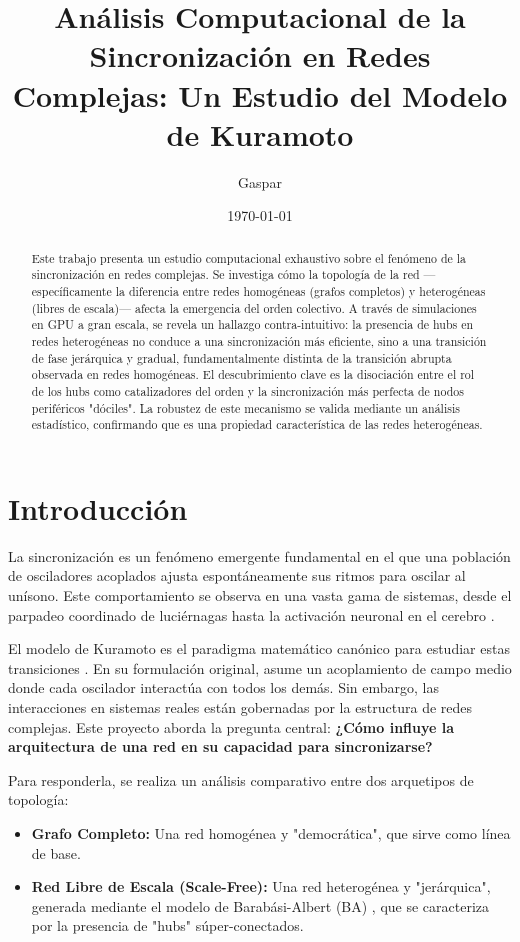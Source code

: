 \documentclass[12pt, a4paper]{article}
\title{Análisis Computacional de la Sincronización en Redes Complejas: Un Estudio del Modelo de Kuramoto}
\author{Gaspar}
\date{\today}
\begin{document}
\maketitle

\begin{abstract}
\noindent Este trabajo presenta un estudio computacional exhaustivo sobre el fenómeno de la sincronización en redes complejas. Se investiga cómo la topología de la red —específicamente la diferencia entre redes homogéneas (grafos completos) y heterogéneas (libres de escala)— afecta la emergencia del orden colectivo. A través de simulaciones en GPU a gran escala, se revela un hallazgo contra-intuitivo: la presencia de hubs en redes heterogéneas no conduce a una sincronización más eficiente, sino a una transición de fase jerárquica y gradual, fundamentalmente distinta de la transición abrupta observada en redes homogéneas. El descubrimiento clave es la disociación entre el rol de los hubs como catalizadores del orden y la sincronización más perfecta de nodos periféricos "dóciles". La robustez de este mecanismo se valida mediante un análisis estadístico, confirmando que es una propiedad característica de las redes heterogéneas.
\end{abstract}

\tableofcontents
\newpage

\section{Introducción}

La sincronización es un fenómeno emergente fundamental en el que una población de osciladores acoplados ajusta espontáneamente sus ritmos para oscilar al unísono. Este comportamiento se observa en una vasta gama de sistemas, desde el parpadeo coordinado de luciérnagas hasta la activación neuronal en el cerebro \cite{Strogatz2003}.

El modelo de Kuramoto es el paradigma matemático canónico para estudiar estas transiciones \cite{Kuramoto1975}. En su formulación original, asume un acoplamiento de campo medio donde cada oscilador interactúa con todos los demás. Sin embargo, las interacciones en sistemas reales están gobernadas por la estructura de redes complejas. Este proyecto aborda la pregunta central: \textbf{¿Cómo influye la arquitectura de una red en su capacidad para sincronizarse?}

Para responderla, se realiza un análisis comparativo entre dos arquetipos de topología:
\begin{itemize}
    \item \textbf{Grafo Completo:} Una red homogénea y "democrática", que sirve como línea de base.
    \item \textbf{Red Libre de Escala (Scale-Free):} Una red heterogénea y "jerárquica", generada mediante el modelo de Barabási-Albert (BA) \cite{Barabasi1999}, que se caracteriza por la presencia de "hubs" súper-conectados.
\end{itemize}
\end{document}
